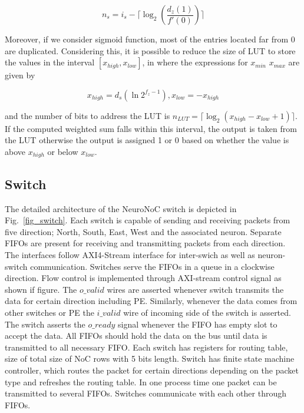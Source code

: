 \begin{equation}
n_{s}=i_{s}-\lceil\log_{2}(\frac{d_{z}(1)}{{f}'(0)})\rceil
\label{equation:ns}
\end{equation}

Moreover, if we consider sigmoid function, most of the entries located far from 0 are duplicated. 
Considering this, it is possible to reduce the size of LUT to store the values in the interval $[x_{high}, x_{low}]$, in where the expressions for $x_{min}$ $x_{max}$ are given by

\begin{equation}
x_{high}=d_{s}(\ln{2^{f_{z}-1}}), x_{low}=-x_{high}
\label{equation:interval}
\end{equation}

and the number of bits to address the LUT is 
$n_{LUT}=\lceil\log_{2}{(x_{high}-x_{low}+1)}\rceil$.
If the computed weighted sum falls within this interval, the output is taken from the LUT otherwise the output is assigned 1 or 0 based on whether the value is above $x_{high}$ or below $x_{low}$. 

\subsection{Switch}
The detailed architecture of the NeuroNoC switch is depicted in Fig.~\ref{fig_switch}. 
Each switch is capable of sending and receiving packets from five direction; North, South, East, West and the associated neuron. 
Separate FIFOs are present for receiving and transmitting packets from each direction.
The interfaces follow AXI4-Stream interface for inter-swich as well as neuron-switch communication.
Switches serve the FIFOs in a queue in a clockwise direction.  Flow control is implemented through AXI-stream control signal as shown if figure.  The $o\_valid$ wires are asserted whenever switch transmits the data for certain direction including PE. Similarly, whenever the data comes from other switches or PE the $i\_valid$ wire of incoming side of the switch is asserted. The switch asserts the $o\_ready$ signal whenever the FIFO has empty slot to accept the data. All FIFOs should hold the data on the bus until data is transmitted to all necessary FIFO. Each switch has registers for routing table, size of total size of NoC rows with 5 bits length. Switch has finite state machine controller, which routes the packet for certain directions depending on the packet type and refreshes the routing table. In one process time one packet can be transmitted to several FIFOs. Switches communicate with each other through FIFOs.  

